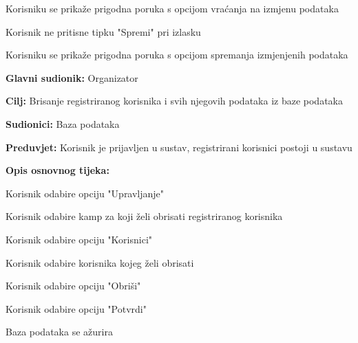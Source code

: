 \begin{packed_item}
\begin{packed_item}
\begin{packed_item}
\begin{packed_enum}
								\item Korisniku se prikaže prigodna poruka s opcijom vraćanja na izmjenu podataka
								
							\end{packed_enum}
							\item[4.b] Korisnik ne pritisne tipku "Spremi" pri izlasku
							\item[] \begin{packed_enum}
								
								\item Korisniku se prikaže prigodna poruka s opcijom spremanja izmjenjenih podataka
								
							\end{packed_enum}
						\end{packed_item}
					\end{packed_item}
					
					\noindent {}
					\begin{packed_item}
						
						\item \textbf{Glavni sudionik: }Organizator
						\item  \textbf{Cilj:} Brisanje registriranog korisnika i svih njegovih podataka iz baze podataka
						\item  \textbf{Sudionici:} Baza podataka
						\item  \textbf{Preduvjet:} Korisnik je prijavljen u sustav, registrirani korisnici postoji u sustavu
						\item  \textbf{Opis osnovnog tijeka:}
						
						\item[] \begin{packed_enum}
							
							\item Korisnik odabire opciju "Upravljanje"
							\item Korisnik odabire kamp za koji želi obrisati registriranog korisnika
							\item Korisnik odabire opciju "Korisnici"
							\item Korisnik odabire korisnika kojeg želi obrisati 
							\item Korisnik odabire opciju "Obriši"
							\item Korisnik odabire opciju "Potvrdi"
							\item Baza podataka se ažurira
						\end{packed_enum}
						

\end{packed_item}
\end{packed_item}
